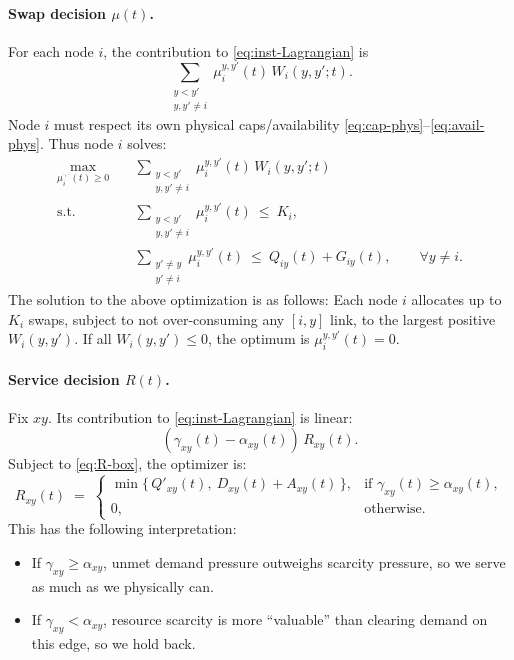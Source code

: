\documentclass[11pt]{article}
\begin{document}
\paragraph{Swap decision $\mu(t)$.}
For each node $i$, the contribution to \eqref{eq:inst-Lagrangian} is
\[
\sum_{\substack{y<y'\\ y,y'\neq i}}
\mu_i^{y,y'}(t)\,W_i(y,y';t).
\]
Node $i$ must respect its own physical caps/availability \eqref{eq:cap-phys}--\eqref{eq:avail-phys}. Thus node $i$ solves:
\begin{equation}
\begin{aligned}
\max_{\mu_i^{\cdot,\cdot}(t)\ge 0}\quad
&\sum_{\substack{y<y'\\ y,y'\neq i}}
\mu_i^{y,y'}(t)\,W_i(y,y';t) \\[2pt]
\text{s.t.}\quad
&\sum_{\substack{y<y'\\ y,y'\neq i}}
\mu_i^{y,y'}(t)\ \le\ K_i, \\
&\sum_{\substack{y'\neq y\\ y'\neq i}}
\mu_i^{y,y'}(t)
\ \le\ Q_{iy}(t)+G_{iy}(t),
\qquad \forall y\neq i.
\end{aligned}
\label{eq:nodeILP-detailed}
\end{equation}
The solution to the above optimization is as follows: Each node $i$ allocates up to $K_i$ swaps, subject to not over-consuming any $[i,y]$ link, to the
largest positive $W_i(y,y')$. If all $W_i(y,y')\le 0$, the optimum is $\mu_i^{y,y'}(t)=0$.

\paragraph{Service decision $R(t)$.}
Fix $xy$. Its contribution to \eqref{eq:inst-Lagrangian} is linear:
\[
(\gamma_{xy}(t)-\alpha_{xy}(t))\,R_{xy}(t).
\]
Subject to \eqref{eq:R-box}, the optimizer is:
\begin{equation}
R_{xy}(t)\;=\;
\begin{cases}
\min\!\big\{\,Q'_{xy}(t),\ D_{xy}(t)+A_{xy}(t)\,\big\},
&\text{if }\gamma_{xy}(t)\ge \alpha_{xy}(t),\\[4pt]
0, &\text{otherwise.}
\end{cases}
\label{eq:Rrule-detailed}
\end{equation}
This has the following interpretation:
\begin{itemize}[leftmargin=2em]
\item If $\gamma_{xy} \ge \alpha_{xy}$, unmet demand pressure outweighs scarcity pressure, so we serve as much as we physically can.
\item If $\gamma_{xy} < \alpha_{xy}$, resource scarcity is more ``valuable'' than clearing demand on this edge, so we hold back.
\end{itemize}
\end{document}
